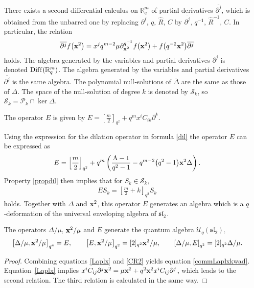 \documentclass[pdftex]{sigma}
\newcommand{\mR}{\mathbb{R}}
\newcommand{\cP}{\mathcal{P}}
\newcommand{\cS}{\mathcal{S}}
\newcommand{\cU}{\mathcal{U}}
\numberwithin{equation}{section}
\begin{document}
There exists a second dif\/ferential calculus on $\mR^m_q$ of partial derivatives $\overline{\partial^j}$, which is obtained from the unbarred one by replacing $\partial^j$, $q$, $\hat{R}$, $C$ by $\overline{\partial^j}$, $q^{-1}$, $\hat{R}^{-1}$, $C$. In particular, the relation
\begin{gather}
\label{partialrbar}
\overline{\partial^j}f\big(\bold{x}^2\big) = x^jq^{m-2}\mu\partial_{\bold{x}^2}^{q^{-2}}f\big(\bold{x}^2\big)+f\big(q^{-2}\bold{x}^2\big)\overline{\partial^j}
\end{gather}
holds. The algebra generated by the variables and partial derivatives $\partial^j$ is denoted ${\rm Dif\/f}(\mR^m_q)$. The algebra generated by the variables and partial derivatives $\overline{\partial^j}$ is the same algebra. The polynomial null-solutions of $\overline{\Delta}$ are the same as those of $\Delta$. The space of the null-solution of degree $k$ is denoted by $\cS_k$, so $\cS_k=\cP_k\cap \ker \Delta$.


\begin{definition}
The operator $E$ is given by $E=[\frac{m}{2}]_{q^2}+q^mx^iC_{ik}\partial^k$.
\end{definition}

Using the expression for the dilation operator in formula \eqref{dil} the operator $E$ can be expressed as
\begin{gather*}
E= \left[\frac{m}{2}\right]_{q^2}+q^m\left(\frac{\Lambda-1}{q^2-1}-q^{m-2}\big(q^2-1\big)\bold{x}^2\Delta\right).
\end{gather*}
Property \eqref{propdil} then implies that for $S_k\in\cS_k$,
\begin{gather}
\label{Eharm}
ES_k = \left[\frac{m}{2}+k\right]_{q^2}S_k
\end{gather}
holds. Together with $\Delta$ and $\bold{x}^2$, this operator $E$ generates an algebra which is a $q$-deformation of the universal enveloping algebra of $\mathfrak{sl}_2$.
\begin{theorem}
\label{sl2}
The operators $\Delta/\mu$, $\bold{x}^2/\mu$ and $E$ generate the quantum algebra $\cU_q(\mathfrak{sl}_2)$,
\begin{gather}
\label{commLaplxkwad}
\left[\Delta/\mu,\bold{x}^2/\mu\right]_{q^4}=E,\qquad
\left[E,\bold{x}^2/\mu\right]_{q^2}=[2]_{q^2} \bold{x}^2/\mu,\qquad
\left[\Delta /\mu,E\right]_{q^2}=[2]_{q^2} \Delta/\mu.
\end{gather}
\end{theorem}

\begin{proof}\sloppy
Combining equations \eqref{Laplx} and \eqref{CR2} yields equation \eqref{commLaplxkwad}. Equation~\eqref{Laplx} implies $x^iC_{ij}\partial^j\bold{x}^2 =\mu \bold{x}^2+q^2\bold{x}^2x^iC_{ij}\partial^j$, which leads to the second relation. The third relation is calculated in the same way.
\end{proof}
\end{document}
